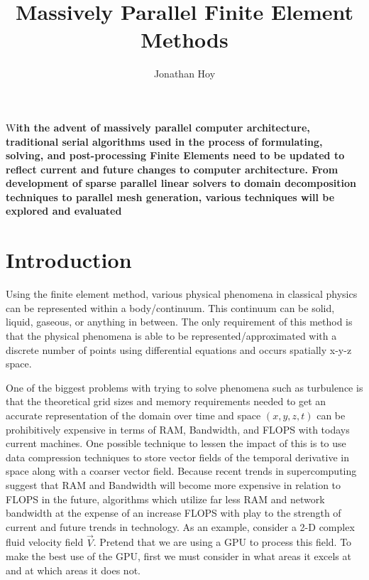 \documentclass[DIV=calc, paper=a4, fontsize=10pt, twocolumn]{scrartcl}	 %
\title{Massively Parallel Finite Element Methods} %
\author{Jonathan Hoy } %
\date{} %
\newcommand{\initial}[1]{ %
\lettrine[lines=3,lhang=0.3,nindent=0em]{
\color{DarkGoldenrod}
{\textsf{#1}}}{}}
\begin{document}
\maketitle %

\thispagestyle{fancy} %


\initial{W}\textbf{ith the advent of massively parallel computer architecture, traditional serial algorithms used in the process of formulating, solving, and post-processing Finite Elements need to be updated to reflect current and future changes to computer architecture. From development of sparse parallel linear solvers to domain decomposition techniques to parallel mesh generation, various techniques will be explored and evaluated}


\section*{Introduction}

Using the finite element method, various physical phenomena in classical physics can be represented within a body/continuum. This continuum can be solid, liquid, gaseous, or anything in between. The only requirement of this method is that the physical phenomena is able to be represented/approximated with a discrete number of points using differential equations and occurs spatially x-y-z space.

One of the biggest problems with trying to solve phenomena such as turbulence is that the theoretical grid sizes and memory requirements needed to get an accurate representation of the domain over time and space $(x,y,z,t)$ can be prohibitively expensive in terms of RAM, Bandwidth, and FLOPS with todays current machines. One possible technique to lessen the impact of this is to use data compression techniques to store vector fields of the temporal derivative in space along with a coarser vector field. Because recent trends in supercomputing suggest that RAM and Bandwidth will become more expensive in relation to FLOPS in the future, algorithms which utilize far less RAM and network bandwidth at the expense of an increase FLOPS with play to the strength of current and future trends in technology.  
As an example, consider a 2-D complex fluid velocity field $\vec{V}$. Pretend that we are using a GPU to process this field. To make the best use of the GPU, first we must consider in what areas it excels at and at which areas it does not.
\end{document}
